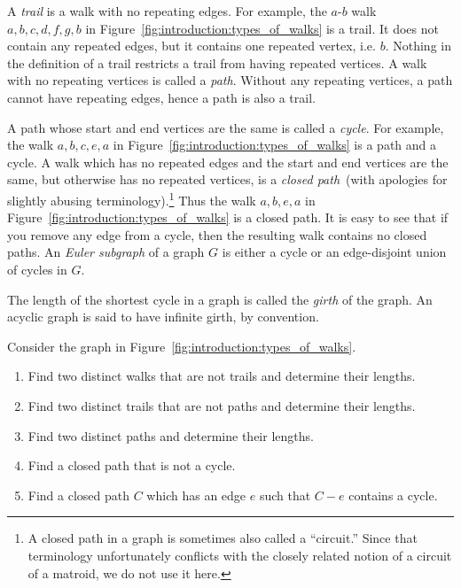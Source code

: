A \emph{trail} is a walk with no repeating edges. For example, the
$a$-$b$ walk $a, b, c, d, f, g, b$ in
Figure~\ref{fig:introduction:types_of_walks} is a trail. It does not
contain any repeated edges, but it contains one repeated vertex,
i.e. $b$. Nothing in the definition of a trail restricts a trail from
having repeated vertices.
A walk with no repeating vertices is called a \emph{path}. Without any
repeating vertices, a path cannot have repeating edges, hence a path
is also a trail.

A path whose start and end vertices are the same is
called a \emph{cycle}. For example, the walk $a, b, c, e, a$
in Figure~\ref{fig:introduction:types_of_walks} is a path and a cycle.
A walk which has no repeated edges and the start and end vertices are
the same, but otherwise has no  repeated vertices, is
a \emph{closed path}~(with apologies for slightly abusing
terminology).\footnote{
A closed path in a graph is sometimes also called a ``circuit.'' Since
that terminology unfortunately conflicts with the closely related
notion of a circuit of a matroid, we do not use it here.}
Thus the walk $a, b, e, a$ in
Figure~\ref{fig:introduction:types_of_walks} is a closed path. It is
easy to see that if you remove any edge from a cycle, then the
resulting walk contains no closed paths. An \emph{Euler subgraph} of a
graph $G$ is either a cycle or an edge-disjoint union of cycles in
$G$.

The length of the shortest cycle in a graph is called the \emph{girth}
of the graph. An acyclic graph is said to have infinite girth, by
convention.

\begin{example}
Consider the graph in Figure~\ref{fig:introduction:types_of_walks}.
%
\begin{enumerate}
\item Find two distinct walks that are not trails and determine their
  lengths.

\item Find two distinct trails that are not paths and determine their
  lengths.

\item Find two distinct paths and determine their lengths.

\item Find a closed path that is not a cycle.

\item Find a closed path $C$ which has an edge $e$ such that $C - e$
  contains a cycle.
\end{enumerate}
\end{example}

